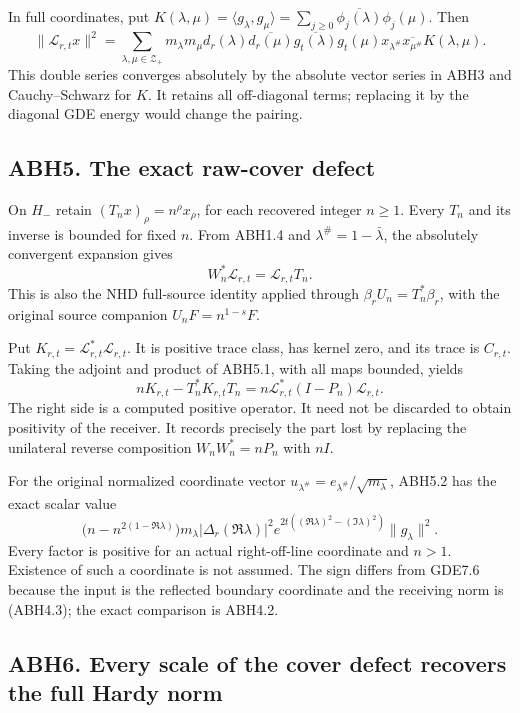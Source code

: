 In full coordinates, put \(K(\lambda,\mu)=\langle g_\lambda,g_\mu\rangle
=\sum_{j\ge0}\overline{\phi_j(\lambda)}\phi_j(\mu)\). Then \[
\|\mathcal L_{r,t}x\|^2=
\sum_{\lambda,\mu\in\mathscr Z_+}
m_\lambda m_\mu d_r(\lambda)\overline{d_r(\mu)}
\overline{g_t(\lambda)}g_t(\mu)
x_{\lambda^\#}\overline{x_{\mu^\#}}K(\lambda,\mu).
\tag{ABH4.3}
\] This double series converges absolutely by the absolute vector series
in ABH3 and Cauchy--Schwarz for \(K\). It retains all off-diagonal
terms; replacing it by the diagonal GDE energy would change the pairing.

\subsection{ABH5. The exact raw-cover
defect}\label{abh5.-the-exact-raw-cover-defect}

On \(H_-\) retain \((T_nx)_\rho=n^\rho x_\rho\), for each recovered
integer \(n\ge1\). Every \(T_n\) and its inverse is bounded for fixed
\(n\). From ABH1.4 and \(\lambda^\#=1-\bar\lambda\), the absolutely
convergent expansion gives \[
\boxed{W_n^*\mathcal L_{r,t}=\mathcal L_{r,t}T_n.}
\tag{ABH5.1}
\] This is also the NHD full-source identity applied through
\(\beta_r U_n=T_n^*\beta_r\), with the original source companion
\(U_nF=n^{1-s}F\).

Put \(K_{r,t}=\mathcal L_{r,t}^*\mathcal L_{r,t}\). It is positive trace
class, has kernel zero, and its trace is \(C_{r,t}\). Taking the adjoint
and product of ABH5.1, with all maps bounded, yields \[
\boxed{nK_{r,t}-T_n^*K_{r,t}T_n
=n\mathcal L_{r,t}^*(I-P_n)\mathcal L_{r,t}.}
\tag{ABH5.2}
\] The right side is a computed positive operator. It need not be
discarded to obtain positivity of the receiver. It records precisely the
part lost by replacing the unilateral reverse composition
\(W_nW_n^*=nP_n\) with \(nI\).

For the original normalized coordinate vector
\(u_{\lambda^\#}=e_{\lambda^\#}/\sqrt{m_\lambda}\), ABH5.2 has the exact
scalar value \[
\bigl(n-n^{2(1-\Re\lambda)}\bigr)
m_\lambda|\Delta_r(\Re\lambda)|^2
e^{2t((\Re\lambda)^2-(\Im\lambda)^2)}\|g_\lambda\|^2.
\tag{ABH5.3}
\] Every factor is positive for an actual right-off-line coordinate and
\(n>1\). Existence of such a coordinate is not assumed. The sign differs
from GDE7.6 because the input is the reflected boundary coordinate and
the receiving norm is (ABH4.3); the exact comparison is ABH4.2.

\subsection{ABH6. Every scale of the cover defect recovers the full
Hardy
norm}\label{abh6.-every-scale-of-the-cover-defect-recovers-the-full-hardy-norm}

